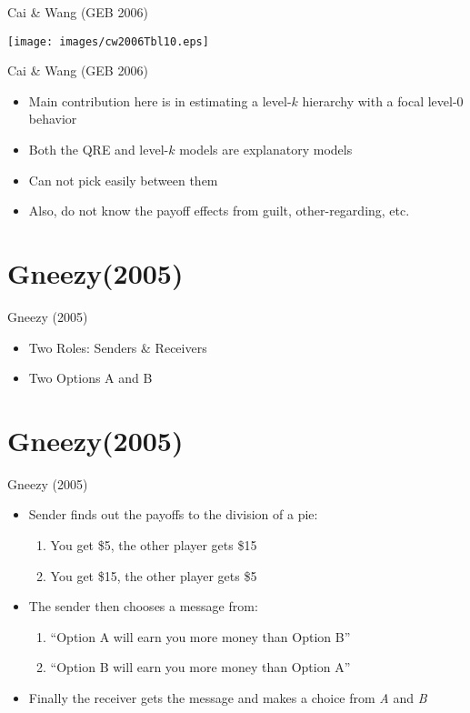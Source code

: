 \documentclass{beamer}
\begin{document}
\begin{frame}{Cai \& Wang (GEB 2006)}
	\begin{center}\texttt{[image: images/cw2006Tbl10.eps]}\end{center}
\end{frame}

\begin{frame}{Cai \& Wang (GEB 2006)}
	\begin{itemize}
		\item Main contribution here is in estimating a level-$k$ hierarchy with a focal level-$0$ behavior
		\item Both the QRE and level-$k$ models are explanatory models
		\item Can not pick easily between them
		\item Also, do not know the payoff effects from guilt, other-regarding, etc.
	\end{itemize}
\end{frame}

\section{Gneezy(2005)}
\begin{frame}{Gneezy (2005)}
	\begin{itemize}
		\item Two Roles: Senders \& Receivers
    \item Two Options A and B
	\end{itemize}
\end{frame}

\section{Gneezy(2005)}
\begin{frame}{Gneezy (2005)}
	\begin{itemize}
		\item Sender finds out the payoffs to the division of a pie:
		\begin{enumerate}[A]
			\item You get \$5, the other player gets \$15
			\item You get \$15, the other player gets \$5
		\end{enumerate}
		\item The sender then chooses a message from:
		\begin{enumerate}[a]
			\item ``Option A will earn you more money than Option B''
			\item ``Option B will earn you more money than Option A''
		\end{enumerate}
		\item Finally the receiver gets the message and makes a choice from \emph{A} and \emph{B}
	\end{itemize}
\end{frame}
\end{document}
